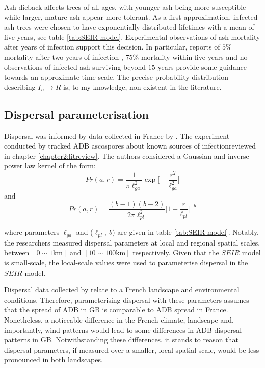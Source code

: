 Ash dieback affects trees of all ages, with younger ash being more susceptible while larger, mature ash appear more tolerant. 
As a first approximation, infected ash trees were chosen to have exponentially distributed lifetimes with a mean of five years, see table \ref{tab:SEIR-model}.
Experimental observations of ash mortality after years of infection support this decision. 
In particular, reports of $5\%$ mortality after two years of infection \cite{kessler2012dieback}, $75\%$ mortality within five years \cite{langer2015ash}  %
and no observations of infected ash surviving beyond $15$ years \cite{wylder2018evidence} provide some guidance towards an approximate time-scale.
The precise probability distribution describing $I_{n}\rightarrow R$ is, to my knowledge, non-existent in the literature.

\subsection{Dispersal parameterisation}

Dispersal was informed by data collected in France by \cite{grosdidier2018tracking}.
The experiment conducted by \cite{grosdidier2018tracking} tracked ADB ascospores about known sources of infection\textemdash reviewed in chapter \ref{chapter2:litreview}.
The authors considered a Gaussian and inverse power law kernel of the form:
\begin{equation}
    Pr(a, r) = \frac{1}{\pi \ell_{ga}^2} \exp\big[-\frac{r^2}{\ell_{ga}^2}\big]
\end{equation}
and
\begin{equation}
    Pr(a, r) = \frac{(b-1)(b-2)}{2\pi \ell_{pl}^2} \big[ 1+ \frac{r}{\ell_{pl}}\big]^{-b}
\end{equation}

where parameters $\ell_{ga}$ and ($\ell_{pl},\ b$) are given in table \ref{tab:SEIR-model}.
Notably, the researchers measured dispersal parameters at local and regional spatial scales, between $[0 \sim 1\mathrm{km}]$ and $[10 \sim 100 \mathrm{km}]$ respectively.
Given that the $SEIR$ model is small-scale, the local-scale values were used to parameterise dispersal in the $SEIR$ model.

Dispersal data collected by \cite{grosdidier2018tracking} relate to a French landscape and environmental conditions.
Therefore, parameterising dispersal with these parameters assumes that the spread of ADB in GB is comparable to ADB spread in France. 
Nonetheless, a noticeable difference in the French climate, landscape and, importantly, wind patterns would lead to some differences in ADB dispersal patterns in GB.
Notwithstanding these differences, it stands to reason that dispersal parameters, if measured over a smaller, local spatial scale, would be less pronounced in both landscapes. 

